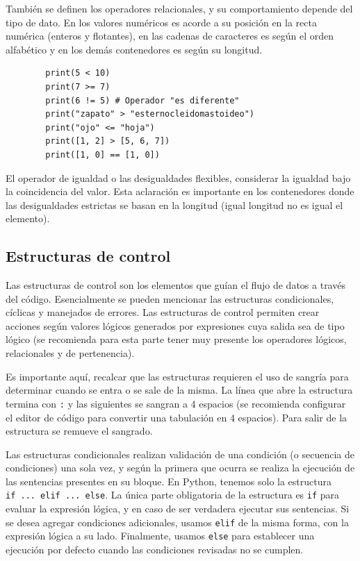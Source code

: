También se definen los operadores relacionales, y su comportamiento
depende del tipo de dato. En los valores numéricos es acorde a su
posición en la recta numérica (enteros y flotantes), en las cadenas de
caracteres es según el orden alfabético y en los demás contenedores es
según su longitud.

\begin{listing}[H]
    \begin{verbatim}
        print(5 < 10)
        print(7 >= 7)
        print(6 != 5) # Operador "es diferente"
        print("zapato" > "esternocleidomastoideo")
        print("ojo" <= "hoja")
        print([1, 2] > [5, 6, 7])
        print([1, 0] == [1, 0])
    \end{verbatim}
\end{listing}


El operador de igualdad o las desigualdades flexibles, considerar la
igualdad bajo la coincidencia del valor. Esta aclaración es importante
en los contenedores donde las desigualdades estrictas se basan en la
longitud (igual longitud no es igual el elemento).

\subsection{Estructuras de control}

Las estructuras de control son los elementos que guían el flujo de datos
a través del código. Esencialmente se pueden mencionar las estructuras
condicionales, cíclicas y manejados de errores. Las estructuras de
control permiten crear acciones según valores lógicos generados por
expresiones cuya salida sea de tipo lógico (se recomienda para esta
parte tener muy presente los operadores lógicos, relacionales y de
pertenencia).

Es importante aquí, recalcar que las estructuras requieren el uso de
sangría para determinar cuando se entra o se sale de la misma. La línea
que abre la estructura termina con \texttt{:} y las siguientes se
sangran a 4 espacios (se recomienda configurar el editor de código para
convertir una tabulación en 4 espacios). Para salir de la estructura se
remueve el sangrado.

Las estructuras condicionales realizan validación de una condición (o
secuencia de condiciones) una sola vez, y según la primera que ocurra se
realiza la ejecución de las sentencias presentes en su bloque. En
Python, tenemos solo la estructura \texttt{if\ ...\ elif\ ...\ else}. La
única parte obligatoria de la estructura es \texttt{if} para evaluar la
expresión lógica, y en caso de ser verdadera ejecutar sus sentencias. Si
se desea agregar condiciones adicionales, usamos \texttt{elif} de la
misma forma, con la expresión lógica a su lado. Finalmente, usamos
\texttt{else} para establecer una ejecución por defecto cuando las
condiciones revisadas no se cumplen.

